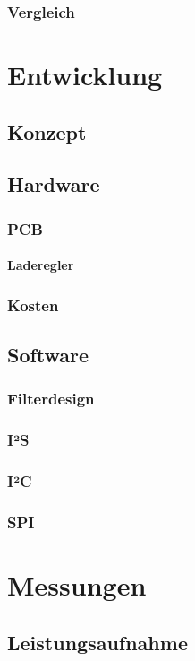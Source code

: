 \documentclass[12pt]{article}
\begin{document}
	\subsubsection{Vergleich}
	
	\newpage
	\section{Entwicklung}
	\subsection{Konzept}
	\subsection{Hardware}
	\subsubsection{PCB}
	\paragraph{Laderegler}
	\subsubsection{Kosten}
	\subsection{Software}
	\subsubsection{Filterdesign}
	\subsubsection{I²S}
	\subsubsection{I²C}
	\subsubsection{SPI}
	
	\newpage
	\section{Messungen}
	\subsection{Leistungsaufnahme}
\end{document}
